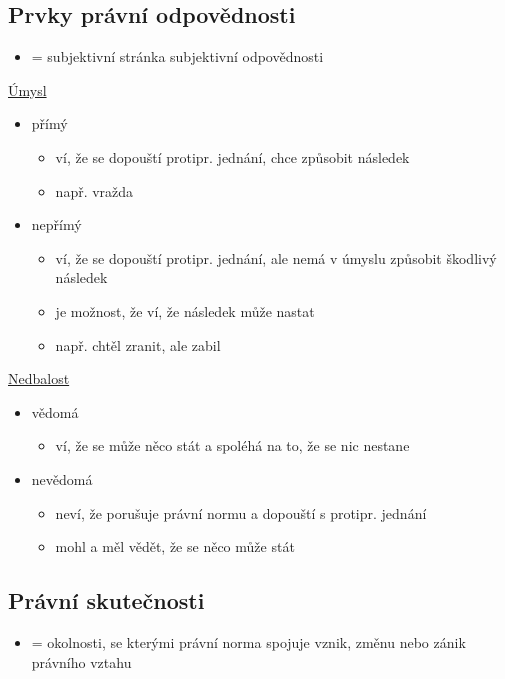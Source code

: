 \subsection*{Prvky právní odpovědnosti}
\begin{itemize}
    \item = subjektivní stránka subjektivní odpovědnosti \\
\end{itemize}

\underline{Úmysl}
\begin{itemize}
    \item přímý
    \begin{itemize}
        \item ví, že se dopouští protipr. jednání, chce způsobit následek
        \item např. vražda
    \end{itemize}
    \item nepřímý
    \begin{itemize}
        \item ví, že se dopouští protipr. jednání, ale nemá v úmyslu způsobit škodlivý následek
        \item je možnost, že ví, že následek může nastat
        \item např. chtěl zranit, ale zabil \\
    \end{itemize}
\end{itemize}

\underline{Nedbalost}
\begin{itemize}
    \item vědomá
    \begin{itemize}
        \item ví, že se může něco stát a spoléhá na to, že se nic nestane
    \end{itemize}
    \item nevědomá
    \begin{itemize}
        \item neví, že porušuje právní normu a dopouští s protipr. jednání
        \item mohl a měl vědět, že se něco může stát
    \end{itemize}
\end{itemize}

\subsection*{Právní skutečnosti}
\begin{itemize}
    \item = okolnosti, se kterými právní norma spojuje vznik, změnu nebo zánik právního vztahu \\
\end{itemize}

